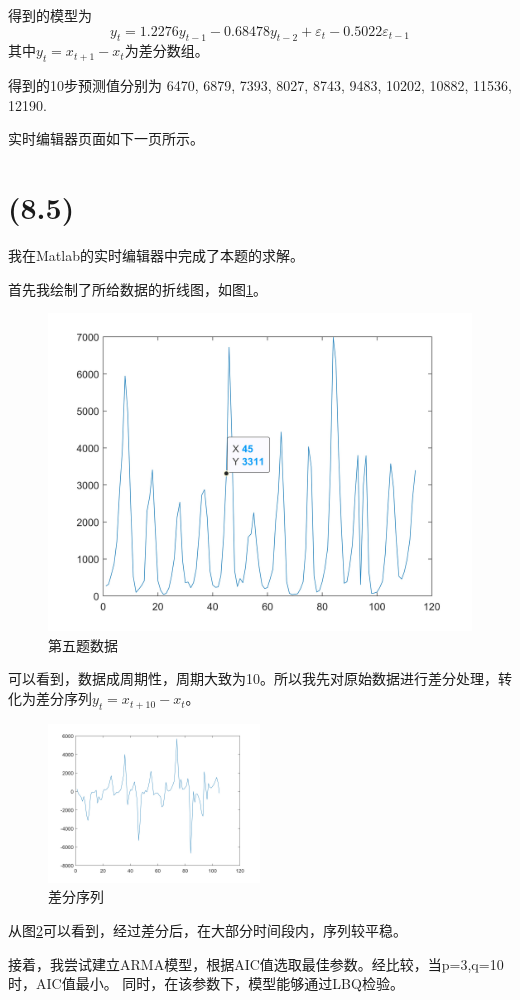 \documentclass[a4paper]{article}
\begin{document}
得到的模型为
\[y_t = 1.2276y_{t-1}-0.68478y_{t-2}+\varepsilon_t-0.5022\varepsilon_{t-1}\]
其中$y_t=x_{t+1}-x_t$为差分数组。

得到的10步预测值分别为
6470,
6879,
7393,
8027,
8743,
9483,
10202,
10882,
11536,
12190.

实时编辑器页面如下一页所示。
\newpage
\section{(8.5)}
我在Matlab的实时编辑器中完成了本题的求解。

首先我绘制了所给数据的折线图，如图\ref{q5}。

\begin{figure}[!h]
    \centering
    \includegraphics*[width =0.5 \textwidth]{q51.jpg}
    \caption{第五题数据}\label{q5}
\end{figure}

可以看到，数据成周期性，周期大致为10。所以我先对原始数据进行差分处理，转化为差分序列$y_t = x_{t+10}-x_t$。

\begin{figure}[!h]
    \centering
    \includegraphics*[width = 0.5\textwidth]{q52.jpg}
    \caption{差分序列}\label{q52}
\end{figure}

从图\ref*{q52}可以看到，经过差分后，在大部分时间段内，序列较平稳。

接着，我尝试建立ARMA模型，根据AIC值选取最佳参数。经比较，当p=3,q=10时，AIC值最小。
同时，在该参数下，模型能够通过LBQ检验。
\end{document}
